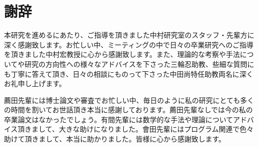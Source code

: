 \chapter{謝辞}

本研究を進めるにあたり、ご指導を頂きました中村研究室のスタッフ・先輩方に深く感謝致します。お忙しい中、ミーティングの中で日々の卒業研究へのご指導を頂きました中村宏教授に心から感謝致します。また、理論的な考察や手法についてや研究の方向性への様々なアドバイスを下さった三輪忍助教、些細な質問にも丁寧に答えて頂き、日々の相談にものって下さった中田尚特任助教両名に深くお礼申し上げます。

薦田先輩には博士論文や審査でお忙しい中、毎日のように私の研究にとても多くの時間を割いてお世話頂き本当に感謝しております。薦田先輩なしでは今の私の卒業論文はなかったでしょう。有間先輩には数学的な手法や理論についてアドバイス頂きまして、大きな助けになりました。會田先輩にはプログラム関連で色々助けて頂きまして、本当に助かりました。皆様に心から感謝致します。